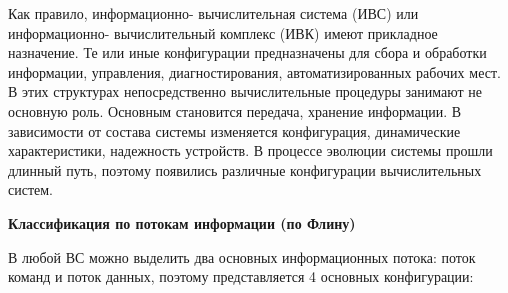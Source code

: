 \documentclass[unicode, 12pt, a4paper, oneside]{article}
\begin{document}
Как правило, информационно- вычислительная система (ИВС) или информационно- вычислительный комплекс (ИВК) имеют прикладное назначение. Те или иные конфигурации предназначены для сбора и обработки информации, управления, диагностирования, автоматизированных рабочих мест. В этих структурах непосредственно вычислительные процедуры занимают не основную роль. Основным становится передача, хранение информации. В зависимости от состава системы изменяется конфигурация, динамические характеристики, надежность устройств. В процессе эволюции системы прошли длинный путь, поэтому появились различные конфигурации вычислительных систем.

\textbf{Классификация по потокам информации (по Флину)}

В любой ВС можно выделить два основных информационных потока: поток команд и поток данных, поэтому представляется 4 основных конфигурации:
\end{document}
